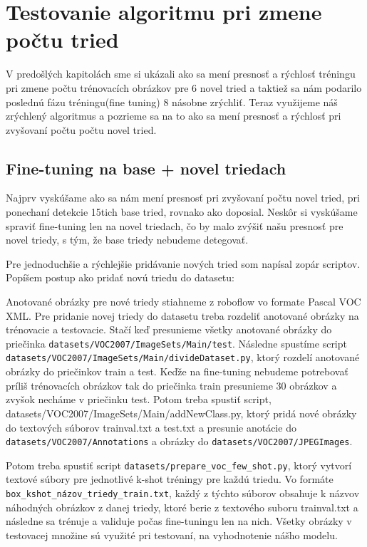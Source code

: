\chapter{Testovanie algoritmu pri zmene počtu tried}\label{chap:implementation}

V predošlých kapitolách sme si ukázali ako sa mení presnosť a rýchlosť tréningu pri zmene počtu trénovacích obrázkov pre 6 novel tried a taktiež sa nám podarilo poslednú fázu tréningu(fine tuning) 8 násobne zrýchliť. Teraz využijeme náš zrýchlený algoritmus a pozrieme sa na to ako sa mení presnosť a rýchlosť pri zvyšovaní počtu počtu novel tried.

\section{Fine-tuning na base + novel triedach}

Najprv vyskúšame ako sa nám mení presnosť pri zvyšovaní počtu novel tried, pri ponechaní detekcie 15tich base tried, rovnako ako doposial. Neskôr si vyskúšame spraviť fine-tuning len na novel triedach, čo by malo zvýšiť našu presnosť pre novel triedy, s tým, že base triedy nebudeme detegovať. 

Pre jednoduchšie a rýchlejšie pridávanie nových tried som napísal zopár scriptov. Popíšem postup ako pridať novú triedu do datasetu: 

Anotované obrázky pre nové triedy stiahneme z roboflow vo formate Pascal VOC XML. Pre pridanie novej triedy do datasetu treba rozdeliť anotované obrázky na trénovacie a testovacie. Stačí keď presunieme všetky anotované obrázky do priečinka \texttt{datasets/VOC2007/ImageSets/Main/test}. Následne spustíme script \texttt{datasets/VOC2007/ImageSets/Main/divideDataset.py}, ktorý rozdelí anotované obrázky do priečinkov train a test. Keďže na fine-tuning nebudeme potrebovať príliš trénovacích obrázkov tak do priečinka train presunieme 30 obrázkov a zvyšok necháme v priečinku test. Potom treba spustiť script, datasets/VOC2007/ImageSets/Main/addNewClass.py, ktorý pridá nové obrázky do textových súborov trainval.txt a test.txt a presunie anotácie do \texttt{datasets/VOC2007/Annotations} a obrázky do \texttt{datasets/VOC2007/JPEGImages}.

Potom treba spustiť script \texttt{datasets/prepare\_voc\_few\_shot.py}, ktorý vytvorí textové súbory pre jednotlivé k-shot tréningy pre každú triedu. Vo formáte \texttt{box\_kshot\_názov\_triedy\_train.txt}, každý z týchto súborov obsahuje k názvov náhodných obrázkov z danej triedy, ktoré berie z textového suboru trainval.txt a následne sa trénuje a validuje počas fine-tuningu len na nich. Všetky obrázky v testovacej množine sú využité pri testovaní, na vyhodnotenie nášho modelu. 

